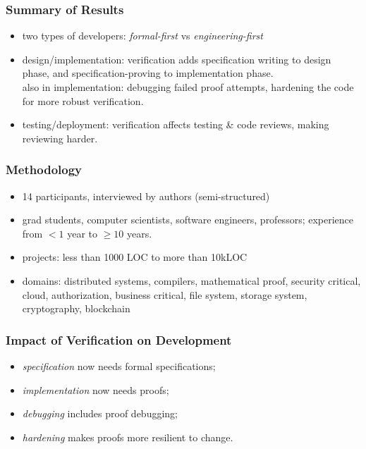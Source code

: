 \documentclass{beamer}
\newenvironment{changemargin}[1]{%
  \begin{list}{}{%
    \setlength{\topsep}{0pt}%
    \setlength{\leftmargin}{#1}%
    \setlength{\rightmargin}{1em}
    \setlength{\listparindent}{\parindent}%
    \setlength{\itemindent}{\parindent}%
    \setlength{\parsep}{\parskip}%
  }%
  \item[]}{\end{list}}
\begin{document}
\begin{frame}
  \frametitle{Summary of Results}
    \large
    \begin{changemargin}{1cm}
      \begin{itemize}
    \item two types of developers: \emph{formal-first} vs \emph{engineering-first}\\[1em]
    \item design/implementation: verification adds specification writing to design phase, and specification-proving to implementation phase. \\[1em]
      also in implementation: debugging failed proof attempts, hardening the code for more robust verification.\\[1em]
    \item testing/deployment: verification affects testing \& code reviews, making reviewing harder.
      \end{itemize}
    \end{changemargin}

\end{frame}

\begin{frame}
  \frametitle{Methodology}
    \large
    \begin{changemargin}{1cm}
      \begin{itemize}
      \item 14 participants, interviewed by authors (semi-structured)
      \item grad students, computer scientists, software engineers, professors; experience from $<1$ year to $\ge 10$ years.\\[1em]
      \item projects: less than 1000 LOC to more than 10kLOC
        \item domains: distributed systems, compilers, mathematical proof,
security critical, cloud, authorization, business critical, file
system, storage system, cryptography, blockchain
      \end{itemize}
    \end{changemargin}
\end{frame}

\begin{frame}
  \frametitle{Impact of Verification on Development}
  \Large
  \begin{changemargin}{1cm}
    \begin{itemize}
    \item \emph{specification} now needs formal specifications;
    \item \emph{implementation} now needs proofs;
    \item \emph{debugging} includes proof debugging;
      \item \emph{hardening} makes proofs more resilient to change.
    \end{itemize}
  \end{changemargin}
\end{frame}
\end{document}
